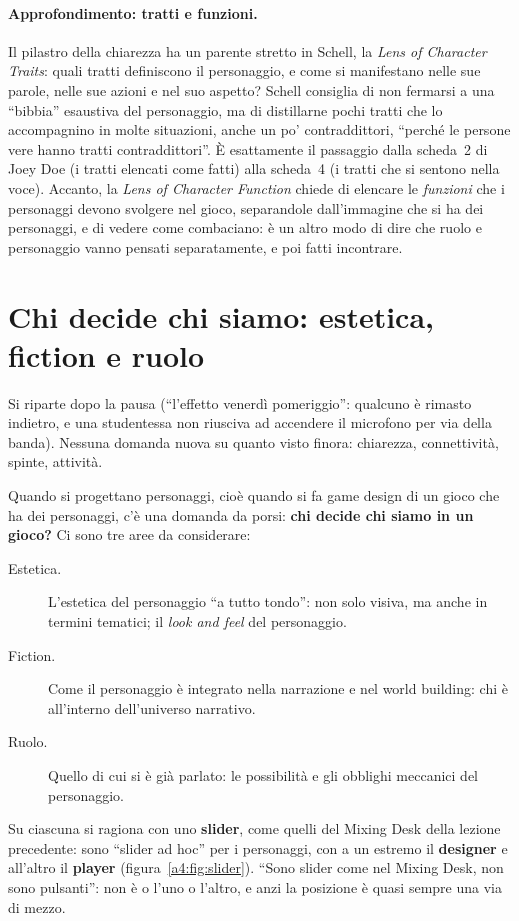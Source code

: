 \paragraph{Approfondimento: tratti e funzioni.} Il pilastro della chiarezza ha un
parente stretto in Schell, la \emph{Lens of Character Traits}: quali tratti
definiscono il personaggio, e come si manifestano nelle sue parole, nelle sue azioni
e nel suo aspetto? Schell consiglia di non fermarsi a una ``bibbia'' esaustiva del
personaggio, ma di distillarne pochi tratti che lo accompagnino in molte situazioni,
anche un po' contraddittori, ``perché le persone vere hanno tratti
contraddittori''. È esattamente il passaggio dalla scheda~2 di Joey Doe (i tratti
elencati come fatti) alla scheda~4 (i tratti che si sentono nella voce). Accanto,
la \emph{Lens of Character Function} chiede di elencare le \emph{funzioni} che i
personaggi devono svolgere nel gioco, separandole dall'immagine che si ha dei
personaggi, e di vedere come combaciano: è un altro modo di dire che ruolo e
personaggio vanno pensati separatamente, e poi fatti incontrare.

\section{Chi decide chi siamo: estetica, fiction e ruolo}
\label{a4:sec:slider}



Si riparte dopo la pausa (``l'effetto venerdì pomeriggio'': qualcuno è rimasto
indietro, e una studentessa non riusciva ad accendere il microfono per via della
banda). Nessuna domanda nuova su quanto visto finora: chiarezza, connettività,
spinte, attività.

Quando si progettano personaggi, cioè quando si fa game design di un gioco che ha
dei personaggi, c'è una domanda da porsi: \textbf{chi decide chi siamo in un gioco?}
Ci sono tre aree da considerare:
\begin{description}
  \item[Estetica.] L'estetica del personaggio ``a tutto tondo'': non solo visiva,
        ma anche in termini tematici; il \emph{look and feel} del personaggio.
  \item[Fiction.] Come il personaggio è integrato nella narrazione e nel world
        building: chi è all'interno dell'universo narrativo.
  \item[Ruolo.] Quello di cui si è già parlato: le possibilità e gli obblighi
        meccanici del personaggio.
\end{description}
Su ciascuna si ragiona con uno \textbf{slider}, come quelli del Mixing Desk della
lezione precedente: sono ``slider ad hoc'' per i personaggi, con a un estremo il
\textbf{designer} e all'altro il \textbf{player} (figura~\ref{a4:fig:slider}).
``Sono slider come nel Mixing Desk, non sono pulsanti'': non è o l'uno o l'altro, e
anzi la posizione è quasi sempre una via di mezzo.

